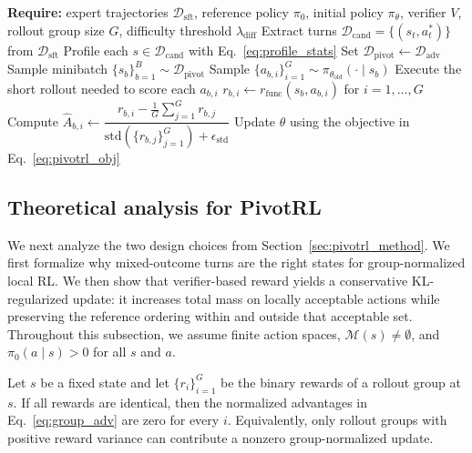 \begin{algorithm}[t]
\caption{PivotRL}
\label{alg:pivotrl}
\begin{algorithmic}[1]
\State \textbf{Require:} expert trajectories $\mathcal{D}_{\mathrm{sft}}$, reference policy $\pi_0$, initial policy $\pi_\theta$, verifier $V$, rollout group size $G$, difficulty threshold $\lambda_{\mathrm{diff}}$
\State Extract turns $\mathcal{D}_{\mathrm{cand}}=\{(s_t,a_t^*)\}$ from $\mathcal{D}_{\mathrm{sft}}$
\State Profile each $s\in\mathcal{D}_{\mathrm{cand}}$ with Eq.~\eqref{eq:profile_stats}
\State Set $\mathcal{D}_{\mathrm{pivot}}\leftarrow \mathcal{D}_{\mathrm{adv}}$
    \State Sample minibatch $\{s_b\}_{b=1}^B \sim \mathcal{D}_{\mathrm{pivot}}$
        \State Sample $\{a_{b,i}\}_{i=1}^G \sim \pi_{\theta_{\mathrm{old}}}(\cdot\mid s_b)$
        \State Execute the short rollout needed to score each $a_{b,i}$
        \State $r_{b,i}\leftarrow r_{\mathrm{func}}(s_b,a_{b,i})$ for $i=1,\dots,G$
        \State Compute $\hat{A}_{b,i}\leftarrow \dfrac{r_{b,i}-\frac{1}{G}\sum_{j=1}^G r_{b,j}}{\mathrm{std}(\{r_{b,j}\}_{j=1}^G) + \epsilon_{\mathrm{std}}}$
    \EndFor
    \State Update $\theta$ using the objective in Eq.~\eqref{eq:pivotrl_obj}
\EndFor
\end{algorithmic}
\end{algorithm}

\subsection{Theoretical analysis for PivotRL}
\label{sec:pivotrl_analysis}

We next analyze the two design choices from Section~\ref{sec:pivotrl_method}. We first formalize why mixed-outcome turns are the right states for group-normalized local RL. We then show that verifier-based reward yields a conservative KL-regularized update: it increases total mass on locally acceptable actions while preserving the reference ordering within and outside that acceptable set. Throughout this subsection, we assume finite action spaces, $\mathcal{M}(s)\neq\emptyset$, and $\pi_0(a\mid s)>0$ for all $s$ and $a$.

\begin{proposition}
\label{prop:mixed}
Let $s$ be a fixed state and let $\{r_i\}_{i=1}^G$ be the binary rewards of a rollout group at $s$. If all rewards are identical, then the normalized advantages in Eq.~\eqref{eq:group_adv} are zero for every $i$. Equivalently, only rollout groups with positive reward variance can contribute a nonzero group-normalized update.
\end{proposition}

